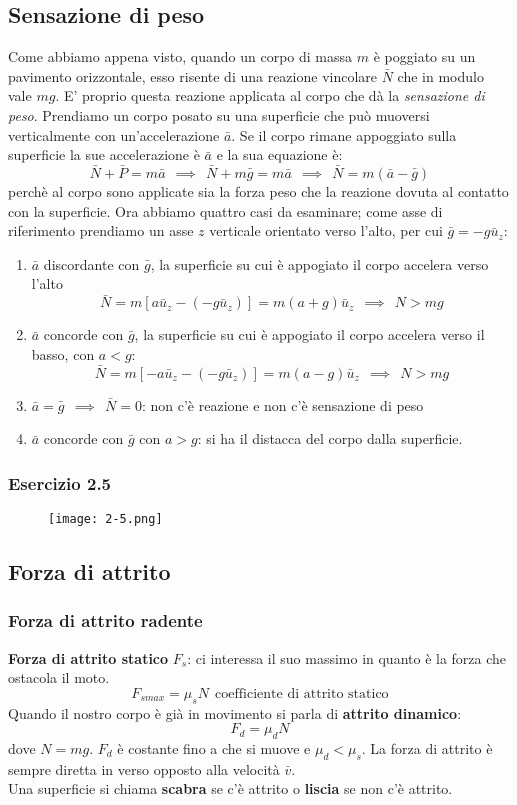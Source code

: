 \documentclass[../../main.tex]{subfiles}
\begin{document}
\subsection{Sensazione di peso}
Come abbiamo appena visto, quando un corpo di massa $m$ è poggiato su un pavimento orizzontale, esso risente di una reazione vincolare $\bar N$ che in modulo vale $mg$. E' proprio questa reazione applicata al corpo che dà la \textit{sensazione di peso}. Prendiamo un corpo posato su una superficie che può muoversi verticalmente con un'accelerazione $\bar a$. Se il corpo rimane appoggiato sulla superficie la sue accelerazione è $\bar a$ e la sua equazione è:
\[
    \bar N + \bar P = m\bar a \ \ \implies \ \ \bar N + m\bar g = m\bar a \ \ \implies \ \ \bar N = m(\bar a - \bar g)
\]
perchè al corpo sono applicate sia la forza peso che la reazione dovuta al contatto con la superficie. Ora abbiamo quattro casi da esaminare; come asse di riferimento prendiamo un asse $z$ verticale orientato verso l'alto, per cui $\bar g = -g\bar u_z$:
\begin{enumerate}
    \item $\bar a$ discordante con $\bar g$, la superficie su cui è appogiato il corpo accelera verso l'alto
          \[
              \bar N = m[a\bar u_z - (-g\bar u_z)] = m(a + g)\bar u_z \ \ \implies \ \ N > mg
          \]
    \item $\bar a$ concorde con $\bar g$, la superficie su cui è appogiato il corpo accelera verso il basso, con $a < g$:
          \[
              \bar N = m[-a\bar u_z - (-g\bar u_z)] = m(a - g)\bar u_z \ \ \implies \ \ N > mg
          \]
    \item $\bar a = \bar g \ \ \implies \ \ \bar N = 0$: non c'è reazione e non c'è sensazione di peso
    \item $\bar a$ concorde con $\bar g$ con $a > g$: si ha il distacca del corpo dalla superficie.
\end{enumerate}
\subsubsection{Esercizio 2.5}
\begin{figure}[H]
    \centering
    \texttt{[image: 2-5.png]}
\end{figure}
\subsection{Forza di attrito}

\subsubsection{Forza di attrito radente}
\textbf{Forza di attrito statico} $F_s$: ci interessa il suo massimo in quanto è la forza che ostacola il moto. 
\[
    F_{s max} = \mu_s N \ \ \text{coefficiente di attrito statico}
\]
Quando il nostro corpo è già in movimento si parla di \textbf{attrito dinamico}:
\[
    F_d = \mu_d N
\]
dove $N = mg$. $F_d$ è costante fino a che si muove e $\mu_d < \mu_s$. La forza di attrito è sempre diretta in verso opposto alla velocità $\bar v$.\\
Una superficie si chiama \textbf{scabra} se c'è attrito o \textbf{liscia} se non c'è attrito.\\
\end{document}
